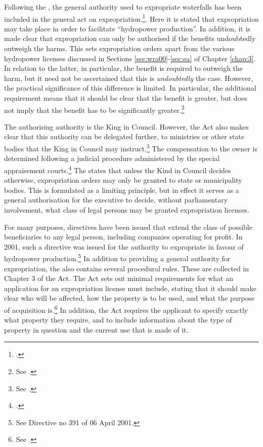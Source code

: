 Following the \cite{wra00}, the general authority used to expropriate waterfalls has been included in the general act on expropriation.\footcite[2 no 51]{ea59}. Here it is stated that expropriation may take place in order to facilitate ``hydropower production''. In addition, it is made clear that expropriation can only be authorised if the benefits undoubtedly outweigh the harms. This sets expropriation orders apart from the various hydropower licenses discussed in Sections \ref{sec:wra00}-\ref{sec:ea} of Chapter \ref{chap:3}. In relation to the latter, in particular, the benefit is required to outweigh the harm, but it need not be ascertained that this is {\it undoubtedly} the case. However, the practical significance of this difference is limited. In particular, the additional requirement means that it should be clear that the benefit is greater, but does not imply that the benefit has to be significantly greater.\footnote{See \cite{lovenskiold09}.}

The authorising authority is the King in Council. However, the Act also makes clear that this authority can be delegated further, to ministries or other state bodies that the King in Council may instruct.\footnote{See \cite[5]{ea59}.} The compensation to the owner is determined following a judicial procedure administered by the special appraisement courts.\footnote{\cite[2]{ea59}.} 
The \cite{ea59} states that unless the Kind in Council decides otherwise, expropriation orders may only be granted to state or municipality bodies. This is formulated as a limiting principle, but in effect it serves as a general authorisation for the executive to decide, without parliamentary involvement, what class of legal persons may be granted expropriation licenses. 

For many purposes, directives have been issued that extend the class of possible beneficiaries to any legal person, including companies operating for profit. In 2001, such a directive was issued for the authority to expropriate in favour of hydropower production.\footnote{See Directive no 391 of 06 April 2001.} In addition to providing a general authority for expropriation, the \cite{ea59} also contains several procedural rules. These are collected in Chapter 3 of the Act. The Act sets out minimal requirements for what an application for an expropriation license must include, stating that it should make clear who will be affected, how the property is to be used, and what the purpose of acquisition is.\footnote{See \cite[11]{ea59}.} In addition, the Act requires the applicant to specify exactly what property they require, and to include information about the type of property in question and the current use that is made of it.

